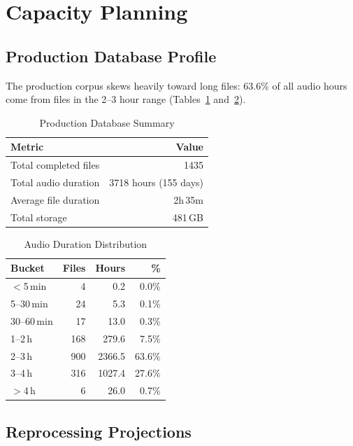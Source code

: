 \documentclass[conference,10pt]{IEEEtran}
\begin{document}
\section{Capacity Planning}

\subsection{Production Database Profile}

The production corpus skews heavily toward long files:
63.6\% of all audio hours come from files in the 2--3 hour range
(Tables~\ref{tab:database} and~\ref{tab:distribution}).

\begin{table}[!t]
\centering
\caption{Production Database Summary}
\label{tab:database}
\begin{tabular}{@{}lr@{}}
\toprule
\textbf{Metric} & \textbf{Value} \\
\midrule
Total completed files   & \num{1435} \\
Total audio duration    & \num{3718} hours (155 days) \\
Average file duration   & 2h\,35m \\
Total storage           & 481\,GB \\
\bottomrule
\end{tabular}
\end{table}

\begin{table}[!t]
\centering
\caption{Audio Duration Distribution}
\label{tab:distribution}
\begin{tabular}{@{}lrrr@{}}
\toprule
\textbf{Bucket} & \textbf{Files} & \textbf{Hours} & \textbf{\%} \\
\midrule
$<$5\,min   &    4 &     0.2 &  0.0\% \\
5--30\,min  &   24 &     5.3 &  0.1\% \\
30--60\,min &   17 &    13.0 &  0.3\% \\
1--2\,h     &  168 &   279.6 &  7.5\% \\
2--3\,h     &  900 & \num{2366.5} & 63.6\% \\
3--4\,h     &  316 & \num{1027.4} & 27.6\% \\
$>$4\,h     &    6 &    26.0 &  0.7\% \\
\bottomrule
\end{tabular}
\end{table}

\subsection{Reprocessing Projections}
\end{document}

